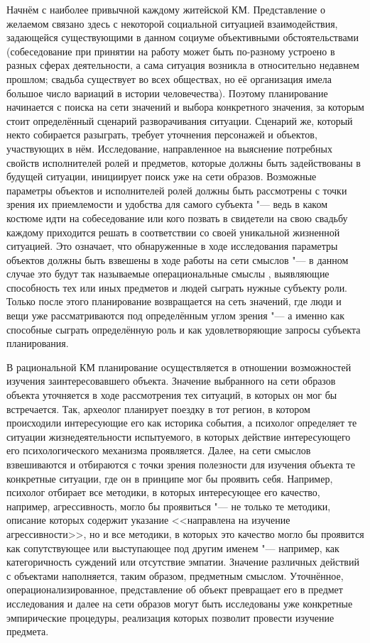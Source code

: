 \documentclass[a4paper, 12pt]{article}
\theoremstyle{plain}
\begin{document}
	Начнём с наиболее привычной каждому житейской КМ. Представление о желаемом связано здесь с некоторой социальной ситуацией взаимодействия, задающейся существующими в данном социуме объективными обстоятельствами (собеседование при принятии на работу может быть по-разному устроено в разных сферах деятельности, а сама ситуация возникла в относительно недавнем прошлом; свадьба существует во всех обществах, но её организация имела большое число вариаций в истории человечества). Поэтому планирование начинается с поиска на сети значений и выбора конкретного значения, за которым стоит определённый сценарий разворачивания ситуации. Сценарий же, который некто собирается разыграть, требует уточнения персонажей и объектов, участвующих в нём. Исследование, направленное на выяснение потребных свойств исполнителей ролей и предметов, которые должны быть задействованы в будущей ситуации, инициирует поиск уже на сети образов. Возможные параметры объектов и исполнителей ролей должны быть рассмотрены с точки зрения их приемлемости и удобства для самого субъекта "--- ведь в каком костюме идти на собеседование или кого позвать в свидетели на свою свадьбу каждому приходится решать в соответствии со своей уникальной жизненной ситуацией. Это означает, что обнаруженные в ходе исследования параметры объектов должны быть взвешены в ходе работы на сети смыслов "--- в данном случае это будут так называемые операциональные смыслы \cite{Tikhomirov2002}, выявляющие способность тех или иных предметов и людей сыграть нужные субъекту роли. Только после этого планирование возвращается на сеть значений, где люди и вещи уже рассматриваются под определённым углом зрения "--- а именно как способные сыграть определённую роль и как удовлетворяющие запросы субъекта планирования.
	
	В рациональной КМ планирование осуществляется в отношении возможностей изучения заинтересовавшего объекта. Значение выбранного на сети образов объекта уточняется в ходе рассмотрения тех ситуаций, в которых он мог бы встречается. Так, археолог планирует поездку в тот регион, в котором происходили интересующие его как историка события, а психолог определяет те ситуации жизнедеятельности испытуемого, в которых действие интересующего его психологического механизма проявляется. Далее, на сети смыслов взвешиваются и отбираются с точки зрения полезности для изучения объекта те конкретные ситуации, где он в принципе мог бы проявить себя. Например, психолог отбирает все методики, в которых интересующее его качество, например, агрессивность, могло бы проявиться "--- не только те методики, описание которых содержит указание <<направлена на изучение агрессивности>>, но и все методики, в которых это качество могло бы проявится как сопутствующее или выступающее под другим именем "--- например, как категоричность суждений или отсутствие эмпатии. Значение различных действий с объектами наполняется, таким образом, предметным смыслом. Уточнённое, операционализированное, представление об объект превращает его в предмет исследования и далее на сети образов могут быть исследованы уже конкретные эмпирические процедуры, реализация которых позволит провести изучение предмета.
	
\end{document}
